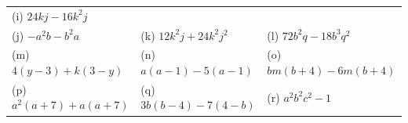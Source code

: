 \begin{enumerate}[noitemsep, label=\textbf{\arabic*}. ]
{\begin{center}
\begin{xtabular*}{\mytablewidth}[t]{|p{10\mystarwidth}|p{10\mystarwidth}|p{10\mystarwidth}|}
        (i) $24kj-16{k}^{2}j$%
     \tabularnewline{}
        (j) $-{a}^{2}b-{b}^{2}a$ &
        (k) $12{k}^{2}j+24{k}^{2}{j}^{2}$ &
        (l) $72{b}^{2}q-18{b}^{3}{q}^{2}$%
     \tabularnewline{}
        (m) $4\left(y-3\right)+k\left(3-y\right)$ &
        (n) $a\left(a-1\right)-5\left(a-1\right)$ &
        (o) $bm\left(b+4\right)-6m\left(b+4\right)$%
     \tabularnewline{}
        (p) ${a}^{2}\left(a+7\right)+a\left(a+7\right)$ &
        (q) $3b\left(b-4\right)-7\left(4-b\right)$ &
        (r) ${a}^{2}{b}^{2}{c}^{2}-1$%

\end{xtabular*}
\end{center}}
\end{enumerate}
